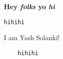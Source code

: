 
\textbf{Hey \textit{folks} yo \textit{hi}}
\begin{verbatim}
hihihi 
\end{verbatim}
I am Yash Solanki!
\begin{verbatim}
    hihihi 
\end{verbatim}
